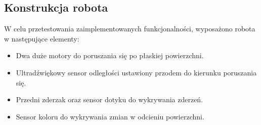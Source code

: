 \subsection{Konstrukcja robota}
W celu przetestowania zaimplementowanych funkcjonalności, wyposażono robota w następujące elementy:
\begin{itemize}
    \item Dwa duże motory do poruszania się po płaskiej powierzchni.
    \item Ultradźwiękowy sensor odległości ustawiony przodem do kierunku poruszania się.
    \item Przedni zderzak oraz sensor dotyku do wykrywania zderzeń.
    \item Sensor koloru do wykrywania zmian w odcieniu powierzchni.
\end{itemize}
